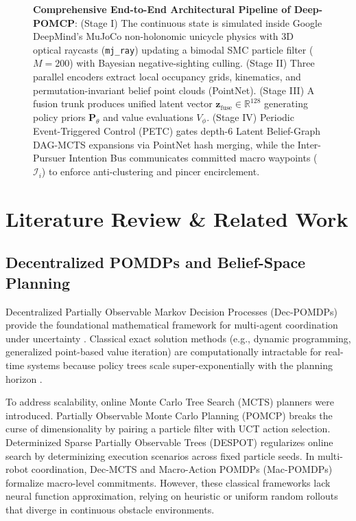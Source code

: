 \documentclass[conference]{IEEEtran}
\begin{document}
\begin{figure}[!t]
{\begin{tikzpicture}
\end{tikzpicture}%
}
\caption{\textbf{Comprehensive End-to-End Architectural Pipeline of Deep-POMCP}: (Stage I) The continuous state is simulated inside Google DeepMind's MuJoCo non-holonomic unicycle physics with 3D optical raycasts (\texttt{mj\_ray}) updating a bimodal SMC particle filter ($M=200$) with Bayesian negative-sighting culling. (Stage II) Three parallel encoders extract local occupancy grids, kinematics, and permutation-invariant belief point clouds (PointNet). (Stage III) A fusion trunk produces unified latent vector $\mathbf{z}_{\text{fuse}} \in \mathbb{R}^{128}$ generating policy priors $\mathbf{P}_\theta$ and value evaluations $V_\phi$. (Stage IV) Periodic Event-Triggered Control (PETC) gates depth-6 Latent Belief-Graph DAG-MCTS expansions via PointNet hash merging, while the Inter-Pursuer Intention Bus communicates committed macro waypoints ($\mathcal{I}_i$) to enforce anti-clustering and pincer encirclement.}
\label{fig:architecture}
\end{figure}

\section{Literature Review \& Related Work}
\subsection{Decentralized POMDPs and Belief-Space Planning}
Decentralized Partially Observable Markov Decision Processes (Dec-POMDPs) provide the foundational mathematical framework for multi-agent coordination under uncertainty \cite{oliehoek2016concise, bernstein2002complexity}. Classical exact solution methods (e.g., dynamic programming, generalized point-based value iteration) are computationally intractable for real-time systems because policy trees scale super-exponentially with the planning horizon \cite{amato2013decentralized}.

To address scalability, online Monte Carlo Tree Search (MCTS) planners were introduced. Partially Observable Monte Carlo Planning (POMCP) \cite{silver2010monte} breaks the curse of dimensionality by pairing a particle filter with UCT action selection. Determinized Sparse Partially Observable Trees (DESPOT) \cite{somani2013despot} regularizes online search by determinizing execution scenarios across fixed particle seeds. In multi-robot coordination, Dec-MCTS \cite{best2019dec} and Macro-Action POMDPs (Mac-POMDPs) \cite{amato2019planning} formalize macro-level commitments. However, these classical frameworks lack neural function approximation, relying on heuristic or uniform random rollouts that diverge in continuous obstacle environments.
\end{document}
